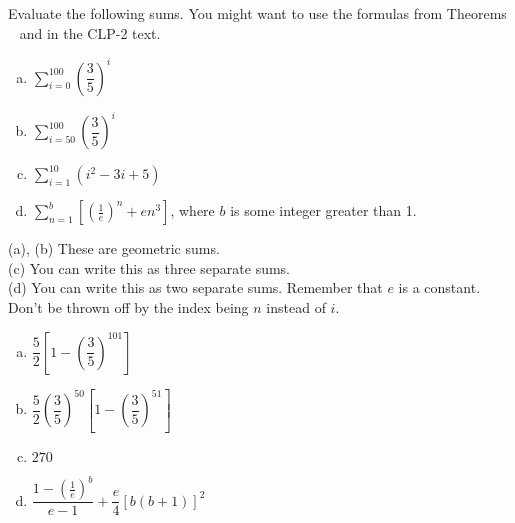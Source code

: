 \begin{question}
Evaluate the following sums. You might want to use the formulas from Theorems ~ and 
in the CLP-2 text.
\begin{enumerate}[(a)]
\item $\displaystyle\sum_{i=0}^{100} \left(\dfrac{3}{5}\right)^i$
\item $\displaystyle\sum_{i=50}^{100} \left(\dfrac{3}{5}\right)^i$
\item $\displaystyle\sum_{i=1}^{10} \left(i^2-3i+5\right)$
\item $\displaystyle\sum_{n=1}^{b}\left[ \left(\frac{1}{e}\right)^n+en^3\right]$, where $b$ is some integer greater than 1.
\end{enumerate}
\end{question}
\begin{hint}
(a), (b) These are geometric sums.\\
(c) You can write this as three separate sums.\\
(d) You can write this as two separate sums. Remember that $e$ is a constant.  Don't be thrown off by the index being $n$ instead of $i$.
\end{hint}
\begin{answer}
\begin{enumerate}[(a)]
\item $\dfrac{5}{2}\left[1-\left(\dfrac{3}{5}\right)^{101}\right]$
\item $\dfrac{5}{2}\left(\dfrac{3}{5}\right)^{50}\left[1-\left(\dfrac{3}{5}\right)^{51}\right]$
\item $270$
\item $\dfrac{1-\left(\frac{1}{e}\right)^b}{e-1}+\dfrac{e}{4}\left[b(b+1)\right]^2$
\end{enumerate}
\end{answer}
